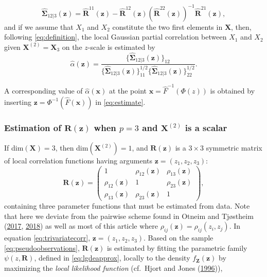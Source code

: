 \documentclass[
  12pt,
  letterpaper]{article}
\newcommand{\X}{\bm{X}}
\newcommand{\Xtwo}{\bm{X}^{(2)}}
\newcommand{\x}{\bm{x}}
\newcommand{\Z}{\bm{Z}}
\newcommand{\z}{\bm{z}}
\newcommand{\R}{\bm{R}}
\newcommand{\hR}{\widehat{\bm{R}}}
\newcommand{\hfSigma}{\widehat{\bm{\Sigma}}}
\newcommand{\halpha}{\widehat{\alpha}}
\theoremstyle{definition}
\theoremstyle{definition}
\theoremstyle{definition}
\theoremstyle{remark}
\begin{document}
\begin{equation}
\hfSigma_{12|3}(\z) = \hR^{11}(\z) -  \hR^{12}(\z)\left(\hR^{22}(\z)\right)^{-1}\hR^{21}(\z),
\label{eq:localpartialcov}
\end{equation}
and if we assume that \(X_1\) and \(X_2\) constitute the two first elements in \(\X\), then, following \eqref{eq:definition}, the local Gaussian partial correlation between \(X_1\) and \(X_2\) given \(\Xtwo = \X_3\) on the \(z\)-scale is estimated by
\begin{equation}
\widehat\alpha(\z) = \frac{\Big\{\hfSigma_{12|3}(\z)\Big\}_{12}}{\Big\{\hfSigma_{12|3}(\z)\Big\}_{11}^{1/2}\Big\{\hfSigma_{12|3}(\z)\Big\}_{22}^{1/2}}.
\label{eq:estimate}
\end{equation}

A corresponding value of \(\halpha(\x)\) at the point \(\x = \widehat F^{-1}(\Phi(z))\) is obtained by inserting \(\z = \Phi^{-1}(\widehat F(\x))\) in \eqref{eq:estimate}.

\hypertarget{chap:trivariate-full}{%
\subsubsection{\texorpdfstring{Estimation of \(\R(\z)\) when \(p = 3\) and \(\Xtwo\) is a scalar}{Estimation of \textbackslash R(\textbackslash z) when p = 3 and \textbackslash Xtwo is a scalar}}\label{chap:trivariate-full}}

If dim\((\X) = 3\), then dim\((\Xtwo)=1\), and \(\R(\z)\) is a \(3\times3\) symmetric matrix of local correlation functions having arguments \(\z = (z_1,z_2,z_3)\):
\begin{equation}
\R(\z) = \begin{pmatrix} 1 & \rho_{12}(\z) & \rho_{13}(\z) \\ \rho_{12}(\z) & 1 & \rho_{23}(\z) \\ \rho_{13}(\z) & \rho_{23}(\z) & 1\end{pmatrix},
\label{eq:trivariatecorr}
\end{equation}
containing three parameter functions that must be estimated from data. Note that here we deviate from the pairwise scheme found in Otneim and Tjøstheim (\protect\hyperlink{ref-otneim2017locally}{2017}, \protect\hyperlink{ref-otneim2017conditional}{2018}) as well as most of this article where \(\rho_{ij}(\z) = \rho_{ij}(z_i, z_j)\). In equation \eqref{eq:trivariatecorr}, \(\z = (z_1,z_2,z_3)\). Based on the sample \eqref{eq:pseudoobservations}, \(\R(\z)\) is estimated by fitting the parametric family \(\psi(z, \R)\), defined in \eqref{eq:lgdeapprox}, locally to the density \(f_{\Z}(\z)\) by maximizing the \emph{local likelihood function} (cf.~Hjort and Jones (\protect\hyperlink{ref-hjort1996locally}{1996})),
\end{document}
